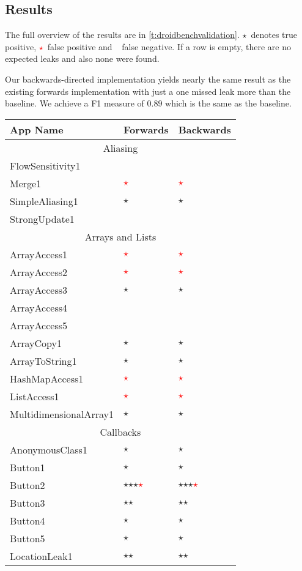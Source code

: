\documentclass[../draft.tex]{subfiles}
\newcommand{\fp}{\textcolor{white}{\textcircled{\textcolor{red}{$\star$}}}}
\newcommand{\fn}{\textcolor{red}{\textcircled{ }}}
\newcommand{\tp}[0]{\textcircled{$\star$}}
\newcommand{\tsub}[1]{\multicolumn{3}{c}{#1}\\\hline}
\begin{document}
    \subsection{Results}
    The full overview of the results are in \autoref{t:droidbenchvalidation}. 
    \tp\ denotes true positive, \fp\ false positive and \fn\ false negative.
    If a row is empty, there are no expected leaks and also none were found. 
    
    Our backwards-directed implementation yields nearly the same result as the existing forwards implementation with just a one missed leak more than the baseline.  We achieve a F1 measure of $0.89$ which is the same as the baseline.

    \begin{longtable}{l | l | l}%
        \textbf{App Name} & \textbf{Forwards} & \textbf{Backwards}\\
        \hline\hline
        \endhead
        \tsub{Aliasing}
        FlowSensitivity1 & &\\
        Merge1 & \fp & \fp\\
        SimpleAliasing1 & \tp & \tp\\
        StrongUpdate1 & &\\
        \hline
        \tsub{Arrays and Lists}
        ArrayAccess1 & \fp & \fp\\
        ArrayAccess2 & \fp & \fp\\
        ArrayAccess3 & \tp & \tp\\
        ArrayAccess4 &  & \\
        ArrayAccess5 &  & \\
        ArrayCopy1 & \tp & \tp\\
        ArrayToString1 & \tp & \tp\\
        HashMapAccess1 & \fp & \fp\\
        ListAccess1 & \fp & \fp\\
        MultidimensionalArray1 & \tp & \tp\\
        \hline
        \tsub{Callbacks}
        AnonymousClass1 & \tp & \tp\\
        Button1 & \tp & \tp \\
        Button2 & \tp \tp \tp \fp & \tp \tp \tp \fp\\
        Button3 & \tp \tp & \tp \tp\\
        Button4 & \tp & \tp\\
        Button5 & \tp & \tp\\
        LocationLeak1 & \tp \tp & \tp \tp\\

\end{longtable}
\end{document}
